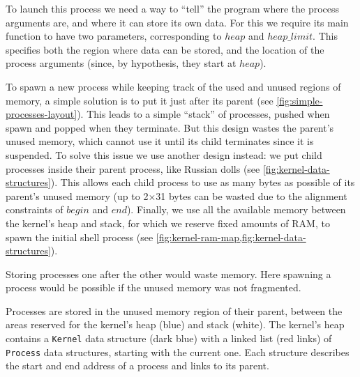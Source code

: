 To launch this process we need a way to ``tell'' the program where the process
arguments are, and where it can store its own data. For this we require its
main function to have two parameters, corresponding to $\mathit{heap}$ and
$\mathit{heap\_limit}$. This specifies both the region where data can be
stored, and the location of the process arguments (since, by hypothesis, they
start at $\mathit{heap}$).

To spawn a new process while keeping track of the used and unused regions of
memory, a simple solution is to put it just after its parent  (see
\cref{fig:simple-processes-layout}). This leads to a simple ``stack'' of
processes, pushed when spawn and popped when they terminate. But this design
wastes the parent's unused memory, which cannot use it until its child
terminates since it is suspended. To solve this issue we use another design
instead: we put child processes inside their parent process, like Russian dolls
(see \cref{fig:kernel-data-structures}). This allows each child process to use
as many bytes as possible of its parent's unused memory (up to 2$\times$31
bytes can be wasted due to the alignment constraints of $\mathit{begin}$ and
$\mathit{end}$). Finally, we use all the available memory between the kernel's
heap and stack, for which we reserve fixed amounts of RAM, to spawn the initial
shell process (see \cref{fig:kernel-ram-map,fig:kernel-data-structures}).

\begin{Figure}
  

  \caption{Storing processes one after the other would waste memory. Here
    spawning a process would be possible if the unused memory was not
    fragmented.}\label{fig:simple-processes-layout}
\end{Figure}

\begin{Figure}
  

  \caption{Processes are stored in the unused memory region of their parent,
  between the areas reserved for the kernel's heap (blue) and stack (white).
  The kernel's heap contains a {\tt Kernel} data structure (dark blue) with a
  linked list (red links) of {\tt Process} data structures, starting with the
  current one. Each structure describes the start and end address of a process
  and links to its parent.}\label{fig:kernel-data-structures}
\end{Figure}

